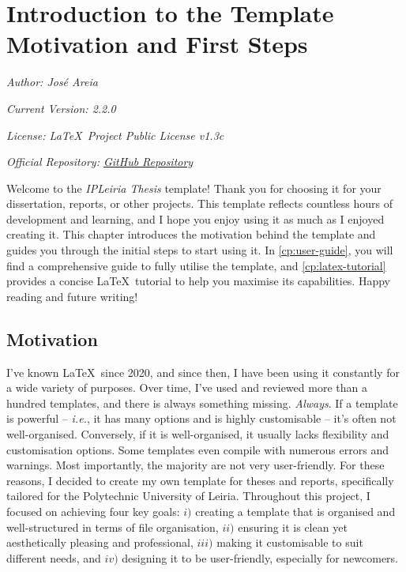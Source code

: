 \chapter[Introduction to the Template: Motivation and First Steps]{Introduction to the Template Motivation and First Steps}
\label{cp:introduction}

{
\parindent0pt

\textit{Author: José Areia}

\textit{Current Version: 2.2.0}

\textit{License: \LaTeX~Project Public License v1.3c}

\textit{Official Repository: \href{https://github.com/joseareia/ipleiria-thesis}{GitHub Repository}}

\vspace{.935em}

Welcome to the \textcolor{maincolour}{\textit{IPLeiria Thesis}} template! Thank you for choosing it for your dissertation, reports, or other projects. This template reflects countless hours of development and learning, and I hope you enjoy using it as much as I enjoyed creating it. This chapter introduces the motivation behind the template and guides you through the initial steps to start using it. In \autoref{cp:user-guide}, you will find a comprehensive guide to fully utilise the template, and \autoref{cp:latex-tutorial} provides a concise \LaTeX~tutorial to help you maximise its capabilities. Happy reading and future writing!

\section{Motivation}
I've known \LaTeX~since 2020, and since then, I have been using it constantly for a wide variety of purposes. Over time, I’ve used and reviewed more than a hundred templates, and there is always something missing. \textit{Always}. If a template is powerful -- \textit{i.e.}, it has many options and is highly customisable -- it’s often not well-organised. Conversely, if it is well-organised, it usually lacks flexibility and customisation options. Some templates even compile with numerous errors and warnings. Most importantly, the majority are not very user-friendly. For these reasons, I decided to create my own template for theses and reports, specifically tailored for the Polytechnic University of Leiria. Throughout this project, I focused on achieving four key goals: \(i)\) creating a template that is organised and well-structured in terms of file organisation, \(ii)\) ensuring it is clean yet aesthetically pleasing and professional, \(iii)\) making it customisable to suit different needs, and \(iv)\) designing it to be user-friendly, especially for newcomers.

}
